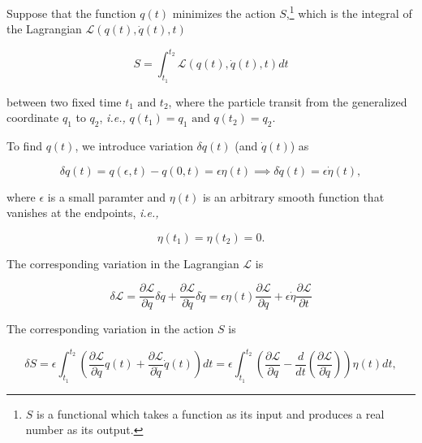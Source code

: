 \documentclass[a4paper,12pt]{report}
\begin{document}
Suppose that the function \(q(t)\) minimizes the action \(S\),\footnote{\(S\) is a functional which takes a function as its input and produces a real number as its output.} which is the integral of the Lagrangian \(\mathcal{L}(q(t), \dot{q}(t), t )\) 

\begin{equation}
	S = \int_{t_1  }^{t_2  } \mathcal{L}\left( q(t),\dot{q}(t) ,t \right) dt
\end{equation}

between two fixed time \(t_1 \text { and } t_2 \), where the particle transit from the generalized coordinate \(q_1 \) to \(q_2 \), \textit{i.e.,} \(q(t_1)=q_1 \text { and } q(t_2 ) = q_2 \).     

To find \(q(t)\), we introduce variation \(\delta q(t)\) (and \(\dot{q} (t)\)) as

\begin{equation}
	\delta q(t) = q(\epsilon ,t) - q(0,t) = \epsilon \eta (t) \implies \delta \dot{q}(t) = \epsilon \dot{\eta }(t),  
\end{equation}

where \(\epsilon \) is a small paramter and \(\eta (t)\) is an arbitrary smooth function that vanishes at the endpoints, \textit{i.e.,} 

\begin{equation}
	\eta (t_1 ) = \eta (t_2 ) = 0. \label{etabound} 
\end{equation}

The corresponding variation in the Lagrangian \(\mathcal{L}\) is

\begin{equation}
	\delta \mathcal{L} = \frac{\partial \mathcal{L}}{\partial q} \delta q + \frac{\partial \mathcal{L}}{\partial \dot{q} } \delta \dot{q} = \epsilon \eta (t) \frac{\partial \mathcal{L}}{\partial q} + \epsilon \dot{\eta } \frac{\partial \mathcal{L}}{\partial t}     
\end{equation}

The corresponding variation in the action \(S\) is

\begin{equation}
	\delta S = \epsilon \int_{t_1 }^{t_2 } \left( \frac{\partial \mathcal{L}}{\partial q}q(t) + \frac{\partial \mathcal{L}}{\partial \dot{q} }\dot{q} (t)   \right) dt  =\epsilon \int_{t_1 }^{t_2 } \left( \frac{\partial \mathcal{L}}{\partial q} - \frac{d}{dt} \left( \frac{\partial \mathcal{L}}{\partial \dot{q} }  \right)   \right) \eta (t) dt,
\end{equation}
\end{document}
